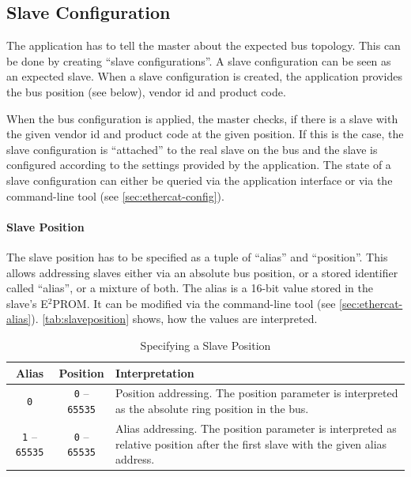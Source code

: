\documentclass[a4paper,12pt,BCOR6mm,bibtotoc,idxtotoc]{scrbook}
\begin{document}
\subsection{Slave Configuration}

The application has to tell the master about the expected bus topology. This
can be done by creating ``slave configurations''. A slave configuration can be
seen as an expected slave. When a slave configuration is created, the
application provides the bus position (see below), vendor id and product code.

When the bus configuration is applied, the master checks, if there is a slave
with the given vendor id and product code at the given position. If this is
the case, the slave configuration is ``attached'' to the real slave on the bus
and the slave is configured according to the settings provided by the
application. The state of a slave configuration can either be queried via the
application interface or via the command-line tool (see
\autoref{sec:ethercat-config}).

\paragraph{Slave Position} The slave position has to be specified as a tuple
of ``alias'' and ``position''. This allows addressing slaves either via an
absolute bus position, or a stored identifier called ``alias'', or a mixture
of both. The alias is a 16-bit value stored in the slave's E$^2$PROM. It can
be modified via the command-line tool (see \autoref{sec:ethercat-alias}).
\autoref{tab:slaveposition} shows, how the values are interpreted.

\begin{table}[htbp]
  \centering
  \caption{Specifying a Slave Position}
  \label{tab:slaveposition}
  \vspace{2mm}
  \begin{tabular}{c|c|p{70mm}}
    Alias & Position & Interpretation\\
    \hline

    \lstinline+0+ & \lstinline+0+ -- \lstinline+65535+ &

    Position addressing. The position parameter is interpreted as the absolute
    ring position in the bus.\\ \hline

    \lstinline+1+ -- \lstinline+65535+ & \lstinline+0+ -- \lstinline+65535+ &

    Alias addressing. The position parameter is interpreted as relative
    position after the first slave with the given alias address. \\ \hline

  \end{tabular}
\end{table}
\end{document}
